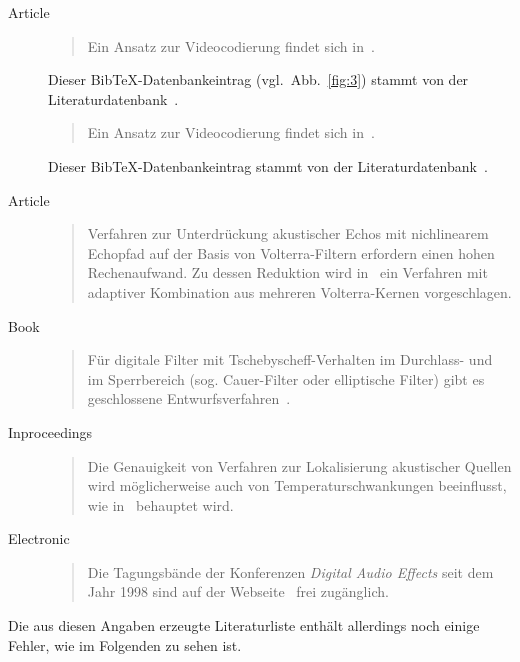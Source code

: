 \documentclass[a4paper, 10pt]{article}
\begin{document}
\begin{description}
\item[Article]

\begin{quote}
Ein Ansatz zur Videocodierung findet sich in~\cite{4703235}.
\end{quote}
Dieser BibTeX-Datenbankeintrag (vgl.~Abb.~\ref{fig:3}) stammt
von der Literaturdatenbank~\cite{IEEE:Xplore:2011}.
\begin{quote}
Ein Ansatz zur Videocodierung findet sich in~\cite{Li09laplacedistribution}.
\end{quote}
Dieser BibTeX-Datenbankeintrag stammt von der Literaturdatenbank~\cite{CiteSeer:2011}.
\item[Article]

\begin{quote}
Verfahren zur Unterdr\"uckung akustischer Echos mit nichlinearem Echopfad
auf der Basis von Volterra-Filtern erfordern einen hohen Rechenaufwand. Zu
dessen Reduktion wird in~\cite{5428855} ein Verfahren mit adaptiver Kombination
aus mehreren Volterra-Kernen vorgeschlagen.
\end{quote}

\item[Book]

\begin{quote}
F\"ur digitale Filter mit Tschebyscheff-Verhalten im Durchlass- und im
Sperrbereich (sog. Cauer-Filter oder elliptische Filter) gibt es geschlossene
Entwurfsverfahren~\cite{Schuessler:DSV2:2010}.
\end{quote}


\item[Inproceedings]

\begin{quote}
Die Genauigkeit von Verfahren zur Lokalisierung akustischer Quellen wird
m\"oglicherweise auch von Temperaturschwankungen beeinflusst, wie
in~\cite{5463320} behauptet wird.
\end{quote}

\item[Electronic]
\begin{quote}
Die Tagungsb\"ande der Konferenzen \emph{Digital Audio Effects} seit dem Jahr
1998 sind auf der Webseite~\cite{DAFX} frei zug\"anglich.
\end{quote}
\end{description}

Die aus diesen Angaben erzeugte Literaturliste enth\"alt allerdings noch einige Fehler, wie im
Folgenden zu sehen ist.
\end{document}
